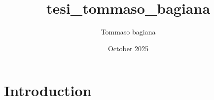 \documentclass{article}
\title{tesi_tommaso_bagiana}
\author{Tommaso bagiana}
\date{October 2025}
\begin{document}
\maketitle

\section{Introduction}
\end{document}
